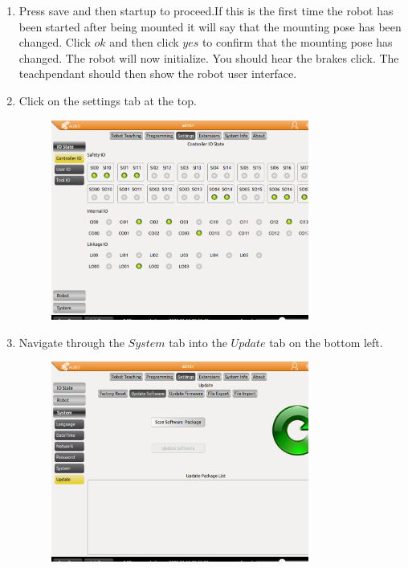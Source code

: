 \documentclass{article}
\begin{document}
\begin{enumerate}
\begin{figure}[H]
\end{figure}
\item Press save and then startup to proceed.If this is the first time the robot has been started after being mounted it will say that the mounting pose has been changed. Click $ok$ and then click $yes$ to confirm that the mounting pose has changed. The robot will now initialize. You should hear the brakes click.  The teachpendant should then show the robot user interface.  
\item Click on the settings tab at the top. 
\begin{figure}[H]\centering
  \includegraphics[width=0.8\textwidth]{../../Images/settings.png}
\end{figure}
\item Navigate through the $System$ tab into the $Update$ tab on the bottom left. 
\begin{figure}[H]\centering
  \includegraphics[width=0.8\textwidth]{../../Images/update.png}
\end{figure}

\end{enumerate}
\end{document}
